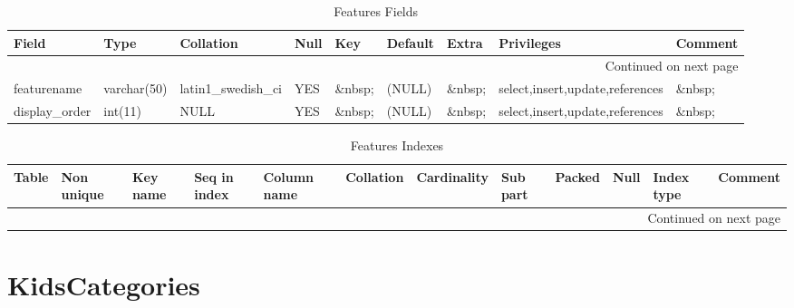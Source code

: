 \documentclass[tablesignature]{scrartcl}
\begin{document}
\begin{longtable}{|l|l|l|l|l|l|l|l|l|}
\caption{Features Fields} \label{tbl:featuresfields}\\
\hline
 Field             &  Type         &  Collation                &  Null     &  Key      &  Default  &  Extra              &  Privileges                       &  Comment \\
\hline
\endhead
\hline\multicolumn{9}{r}{Continued on next page}\
\endfoot
\endlastfoot
\hline
 featureid         &  int(11)      &  NULL                     &  \&nbsp;  &  PRI      &  (NULL)   &  auto\_{}increment  &  select,insert,update,references  &  \&nbsp;  \\
 featurename       &  varchar(50)  &  latin1\_{}swedish\_{}ci  &  YES      &  \&nbsp;  &  (NULL)   &  \&nbsp;            &  select,insert,update,references  &  \&nbsp;  \\
 display\_{}order  &  int(11)      &  NULL                     &  YES      &  \&nbsp;  &  (NULL)   &  \&nbsp;            &  select,insert,update,references  &  \&nbsp;  \\
\hline
\end{longtable}


\begin{longtable}{|l|l|l|l|l|l|l|l|l|l|l|l|}
\caption{Features Indexes} \label{tbl:featuresindexes}\\
\hline
 Table     &  Non unique  &  Key name  &  Seq in index  &  Column name  &  Collation  &  Cardinality  &  Sub part  &  Packed  &  Null     &  Index type  &  Comment \\
\hline
\endhead
\hline\multicolumn{12}{r}{Continued on next page}\
\endfoot
\endlastfoot
\hline
 Features  &           0  &  PRIMARY   &             1  &  featureid    &  A          &           12  &  (NULL)    &  (NULL)  &  \&nbsp;  &  BTREE       &  \&nbsp   \\
\hline
\end{longtable}
\section{KidsCategories}
\label{sec-4}
\end{document}
